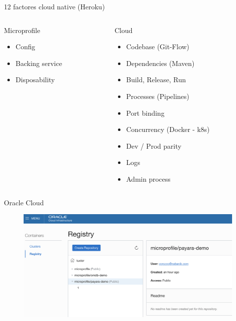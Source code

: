 \documentclass{beamer}
\begin{document}
\begin{frame}{12 factores cloud native (Heroku)}

\begin{columns}[T] %
	
	\begin{column}[T]{4cm} %
		\begin{alertblock}{Microprofile}
	\begin{itemize}
		\item Config
		\item Backing service
		\item Disposability
	\end{itemize}
\end{alertblock}
	\end{column}
	\begin{column}[T]{6cm} %
		\begin{block}{Cloud}
	\begin{itemize}
	\item Codebase (Git-Flow)
	\item Dependencies (Maven)
	\item Build, Release, Run
	\item Processes (Pipelines)
	\item Port binding
	\item Concurrency (Docker - k8s)
	\item Dev / Prod parity
	\item Logs
	\item Admin process
\end{itemize}
\end{block}
	\end{column}
\end{columns}

\end{frame}

\begin{frame}{Oracle Cloud}
\begin{figure}
	\centering
	\includegraphics[width=0.95\linewidth]{Images/oc1}
\end{figure}
\end{frame}
\end{document}
